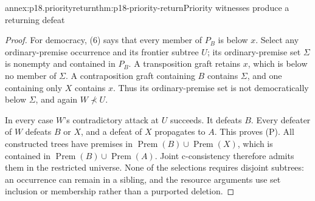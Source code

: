 \begin{annexitem}{annex:p18.priorityreturn}{thm:p18-priority-return}{Priority witnesses produce a returning defeat}
\begin{proof}
For democracy, (6) says that every member of \(P_B\) is below \(x\).
Select any ordinary-premise occurrence and its frontier subtree \(U\);
its ordinary-premise set \(\Sigma\) is nonempty and contained in \(P_B\).
A transposition graft retains \(x\), which is below no member of
\(\Sigma\). A contraposition graft containing \(B\) contains
\(\Sigma\), and one containing only \(X\) contains \(x\).
Thus its ordinary-premise set is not democratically below \(\Sigma\),
and again \(W\not\prec U\).

In every case \(W\)'s contradictory attack at \(U\) succeeds.
It defeats \(B\). Every defeater of \(W\) defeats \(B\) or \(X\),
and a defeat of \(X\) propagates to \(A\). This proves (P).
All constructed trees have premises in
\(\operatorname{Prem}(B)\cup\operatorname{Prem}(X)\),
which is contained in \(\operatorname{Prem}(B)\cup\operatorname{Prem}(A)\).
Joint c-consistency therefore admits them in the restricted universe.
None of the selections requires disjoint subtrees: an occurrence can
remain in a sibling, and the resource arguments use set inclusion or
membership rather than a purported deletion.
\end{proof}
\end{annexitem}

